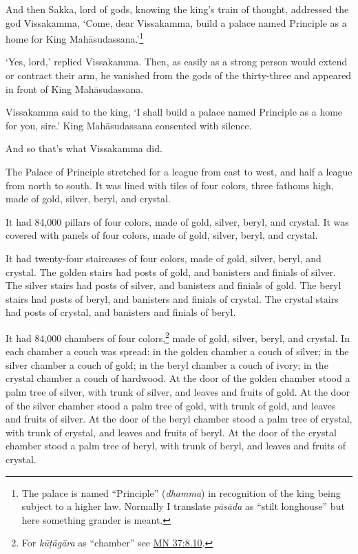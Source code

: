 \documentclass[12pt,openany]{book}%
\begin{document}
And then Sakka, lord of gods, knowing the king’s train of thought, addressed the god Vissakamma, ‘Come, dear Vissakamma, build a palace named Principle as a home for King \textsanskrit{Mahāsudassana}.’\footnote{The palace is named “Principle” (\textit{dhamma}) in recognition of the king being subject to a higher law. Normally I translate \textit{\textsanskrit{pāsāda}} as “stilt longhouse” but here something grander is meant. } 

‘Yes, lord,’ replied Vissakamma. Then, as easily as a strong person would extend or contract their arm, he vanished from the gods of the thirty-three and appeared in front of King \textsanskrit{Mahāsudassana}. 

Vissakamma said to the king, ‘I shall build a palace named Principle as a home for you, sire.’ King \textsanskrit{Mahāsudassana} consented with silence. 

And so that’s what Vissakamma did. 

The Palace of Principle stretched for a league from east to west, and half a league from north to south. It was lined with tiles of four colors, three fathoms high, made of gold, silver, beryl, and crystal. 

It had 84,000 pillars of four colors, made of gold, silver, beryl, and crystal. It was covered with panels of four colors, made of gold, silver, beryl, and crystal. 

It had twenty-four staircases of four colors, made of gold, silver, beryl, and crystal. The golden stairs had posts of gold, and banisters and finials of silver. The silver stairs had posts of silver, and banisters and finials of gold. The beryl stairs had posts of beryl, and banisters and finials of crystal. The crystal stairs had posts of crystal, and banisters and finials of beryl. 

It had 84,000 chambers of four colors,\footnote{For \textit{\textsanskrit{kūṭāgāra}} as “chamber” see \href{https://suttacentral.net/mn37/en/sujato\#8.10}{MN 37:8.10}. } made of gold, silver, beryl, and crystal. In each chamber a couch was spread: in the golden chamber a couch of silver; in the silver chamber a couch of gold; in the beryl chamber a couch of ivory; in the crystal chamber a couch of hardwood. At the door of the golden chamber stood a palm tree of silver, with trunk of silver, and leaves and fruits of gold. At the door of the silver chamber stood a palm tree of gold, with trunk of gold, and leaves and fruits of silver. At the door of the beryl chamber stood a palm tree of crystal, with trunk of crystal, and leaves and fruits of beryl. At the door of the crystal chamber stood a palm tree of beryl, with trunk of beryl, and leaves and fruits of crystal. 
\end{document}
